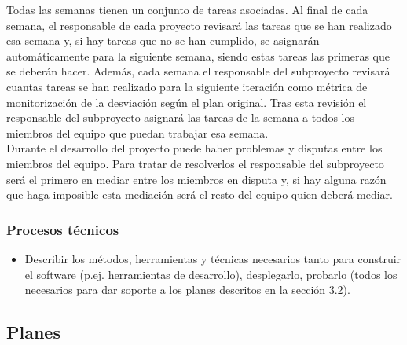 \documentclass[12pt]{article}%
\begin{document}
Todas las semanas tienen un conjunto de tareas asociadas. Al final de cada semana, el responsable de cada proyecto revisar\'a las tareas que se han realizado esa semana y, si hay tareas que no se han cumplido, se asignar\'an autom\'aticamente para la siguiente semana, siendo estas tareas las primeras que se deber\'an hacer. Adem\'as, cada semana el responsable del subproyecto revisar\'a cuantas tareas se han realizado para la siguiente iteraci\'on  como m\'etrica de monitorizaci\'on de la desviaci\'on seg\'un el plan original. Tras esta revisi\'on el responsable del subproyecto asignar\'a las tareas de la semana a todos los miembros del equipo que puedan trabajar esa semana. \\

Durante el desarrollo del proyecto puede haber problemas y disputas entre los miembros del equipo. Para tratar de resolverlos el responsable del subproyecto ser\'a el primero en mediar entre los miembros en disputa y, si hay alguna raz\'on que haga imposible esta mediaci\'on ser\'a el resto del equipo quien deber\'a mediar. \\

\subsubsection{Procesos t\'ecnicos}
\begin{itemize}
	\item Describir los m\'etodos, herramientas y t\'ecnicas necesarios tanto para construir el software (p.ej. herramientas de desarrollo), desplegarlo, probarlo (todos los necesarios para dar soporte a los planes descritos en la secci\'on 3.2).\\
\end{itemize}

\subsection{Planes}
\end{document}
